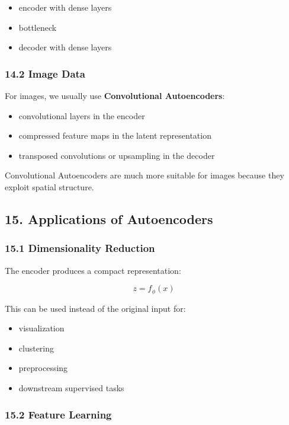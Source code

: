 \documentclass[
  italian,
  11pt,
]{article}
\begin{document}
\begin{itemize}
\item
  encoder with dense layers
\item
  bottleneck
\item
  decoder with dense layers
\end{itemize}

\subsubsection{14.2 Image Data}\label{image-data}

For images, we usually use \textbf{Convolutional Autoencoders}:

\begin{itemize}
\item
  convolutional layers in the encoder
\item
  compressed feature maps in the latent representation
\item
  transposed convolutions or upsampling in the decoder
\end{itemize}

Convolutional Autoencoders are much more suitable for images because
they exploit spatial structure.

\subsection{15. Applications of
Autoencoders}\label{applications-of-autoencoders}

\subsubsection{15.1 Dimensionality
Reduction}\label{dimensionality-reduction}

The encoder produces a compact representation:

\[
z = f_\phi(x)
\]

This can be used instead of the original input for:

\begin{itemize}
\item
  visualization
\item
  clustering
\item
  preprocessing
\item
  downstream supervised tasks
\end{itemize}

\subsubsection{15.2 Feature Learning}\label{feature-learning}
\end{document}

